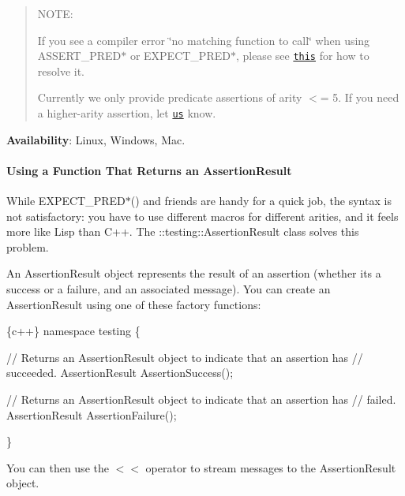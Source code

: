 \begin{quote}
N\+O\+TE\+:


\begin{DoxyEnumerate}
\item If you see a compiler error \char`\"{}no matching function to call\char`\"{} when using {\ttfamily A\+S\+S\+E\+R\+T\+\_\+\+P\+R\+E\+D$\ast$} or {\ttfamily E\+X\+P\+E\+C\+T\+\_\+\+P\+R\+E\+D$\ast$}, please see \href{faq.md#the-compiler-complains-no-matching-function-to-call-when-i-use-assert_pred-how-do-i-fix-it}{\tt this} for how to resolve it.
\end{DoxyEnumerate}
\begin{DoxyEnumerate}
\item Currently we only provide predicate assertions of arity $<$= 5. If you need a higher-\/arity assertion, let \href{https://github.com/google/googletest/issues}{\tt us} know. 
\end{DoxyEnumerate}\end{quote}


{\bfseries Availability}\+: Linux, Windows, Mac.

\paragraph*{Using a Function That Returns an Assertion\+Result}

While {\ttfamily E\+X\+P\+E\+C\+T\+\_\+\+P\+R\+E\+D$\ast$()} and friends are handy for a quick job, the syntax is not satisfactory\+: you have to use different macros for different arities, and it feels more like Lisp than C++. The {\ttfamily \+::testing\+::\+Assertion\+Result} class solves this problem.

An {\ttfamily Assertion\+Result} object represents the result of an assertion (whether it\textquotesingle{}s a success or a failure, and an associated message). You can create an {\ttfamily Assertion\+Result} using one of these factory functions\+:


\begin{DoxyCode}
\{c++\}
namespace testing \{

// Returns an AssertionResult object to indicate that an assertion has
// succeeded.
AssertionResult AssertionSuccess();

// Returns an AssertionResult object to indicate that an assertion has
// failed.
AssertionResult AssertionFailure();

\}
\end{DoxyCode}


You can then use the {\ttfamily $<$$<$} operator to stream messages to the {\ttfamily Assertion\+Result} object.

